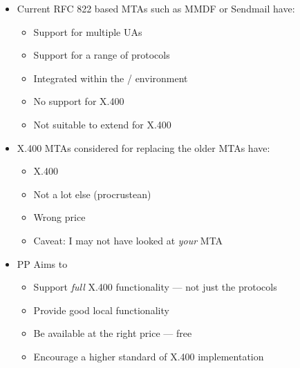 \begin {bwslide}

\begin {itemize}
\item  Current RFC 822 based MTAs such as MMDF or Sendmail have:
\begin {itemize}
\item Support for multiple UAs
\item Support for a range of protocols
\item Integrated within the \unix/ environment
\item No support for X.400
\item Not suitable to extend for X.400
\end {itemize}

\item X.400 MTAs considered for replacing the older MTAs have:
\begin {itemize}
\item X.400
\item Not a lot else (procrustean)
\item Wrong price
\item Caveat: I may not have looked at {\em your} MTA
\end {itemize}

\item PP Aims to
\begin {itemize}
\item Support {\em full} X.400 functionality --- not just the protocols

\item Provide good local functionality

\item Be available at the right price --- free

\item Encourage a higher standard of X.400 implementation
\end {itemize}

\end {itemize}

\end {bwslide}



